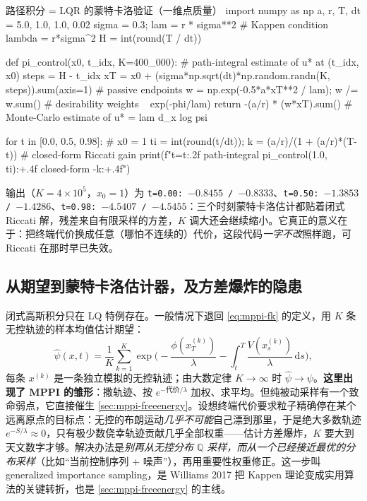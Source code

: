 \begin{codebox}[Python]{路径积分 = LQR 的蒙特卡洛验证（一维点质量）}
import numpy as np
a, r, T, dt = 5.0, 1.0, 1.0, 0.02
sigma = 0.3; lam = r * sigma**2              # Kappen condition  lambda = r*sigma^2
H = int(round(T / dt))

def pi_control(x0, t_idx, K=400_000):        # path-integral estimate of u* at (t_idx, x0)
    steps = H - t_idx
    xT = x0 + (sigma*np.sqrt(dt)*np.random.randn(K, steps)).sum(axis=1)  # passive endpoints
    w = np.exp(-0.5*a*xT**2 / lam); w /= w.sum()         # desirability weights  ~ exp(-phi/lam)
    return -(a/r) * (w*xT).sum()             # Monte-Carlo estimate of  u* = lam d_x log psi

for t in [0.0, 0.5, 0.98]:                   # x0 = 1
    ti = int(round(t/dt)); k = (a/r)/(1 + (a/r)*(T-t))   # closed-form Riccati gain
    print(f"t={t:.2f}  path-integral {pi_control(1.0, ti):+.4f}   closed-form {-k:+.4f}")
\end{codebox}

\noindent 输出（$K=4\times10^5$，$x_0=1$）为 \texttt{t=0.00: $-0.8455$ / $-0.8333$}、\texttt{t=0.50: $-1.3853$ / $-1.4286$}、\texttt{t=0.98: $-4.5407$ / $-4.5455$}：三个时刻蒙特卡洛估计都贴着闭式 Riccati 解，残差来自有限采样的方差，$K$ 调大还会继续缩小。它真正的意义在于：把终端代价换成任意（哪怕不连续的）代价，这段代码\emph{一字不改}照样跑，可 Riccati 在那时早已失效。

\subsection{从期望到蒙特卡洛估计器，及方差爆炸的隐患}
\label{sec:mppi-mc}

闭式高斯积分只在 LQ 特例存在。一般情况下退回 \cref{eq:mppi-fk} 的定义，用 $K$ 条无控轨迹的样本均值估计期望：
\begin{equation}
  \hat\psi(x,t)=\frac{1}{K}\sum_{k=1}^{K}\exp\!\Big(-\frac{\phi(x_T^{(k)})}{\lambda}-\int_t^T\frac{V(x_s^{(k)})}{\lambda}\,\mathrm{d}s\Big),
  \label{eq:mppi-psihat}
\end{equation}
每条 $x^{(k)}$ 是一条独立模拟的无控轨迹；由大数定律 $K\to\infty$ 时 $\hat\psi\to\psi$。\textbf{这里出现了 MPPI 的雏形}：撒轨迹、按 $e^{-\text{代价}/\lambda}$ 加权、求平均。但纯被动采样有一个致命弱点，它直接催生 \cref{sec:mppi-freeenergy}。设想终端代价要求粒子精确停在某个远离原点的目标点：无控的布朗运动\emph{几乎不可能}自己漂到那里，于是绝大多数轨迹 $e^{-S/\lambda}\approx0$，只有极少数侥幸轨迹贡献几乎全部权重——估计方差爆炸，$K$ 要大到天文数字才够。解决办法是\emph{别再从无控分布 $\mathbb{Q}$ 采样，而从一个已经接近最优的分布采样}（比如“当前控制序列 + 噪声”），再用重要性权重修正。这一步叫 generalized importance sampling，是 Williams 2017 把 Kappen 理论变成实用算法的关键转折\cite{williams2017model}，也是 \cref{sec:mppi-freeenergy} 的主线。

